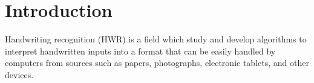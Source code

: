 \section{Introduction}

Handwriting recognition (HWR) is a field which study and develop algorithms to
interpret handwritten inputs into a format that can be easily handled by computers
from sources such as papers, photographs, electronic tablets, and other devices.


